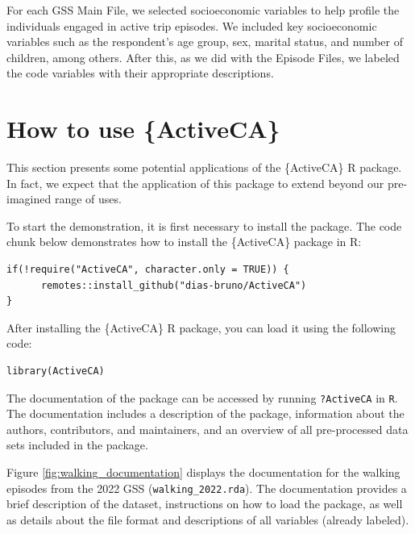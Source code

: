 \documentclass[Royal,times,sageh]{sagej}
\begin{document}
For each GSS Main File, we selected socioeconomic variables to help
profile the individuals engaged in active trip episodes. We included key
socioeconomic variables such as the respondent's age group, sex, marital
status, and number of children, among others. After this, as we did with
the Episode Files, we labeled the code variables with their appropriate
descriptions.

\section{How to use \{ActiveCA\}}\label{how-to-use-activeca}

This section presents some potential applications of the \{ActiveCA\} R
package. In fact, we expect that the application of this package to
extend beyond our pre-imagined range of uses.

To start the demonstration, it is first necessary to install the
package. The code chunk below demonstrates how to install the
\{ActiveCA\} package in R:

\begin{verbatim}
if(!require("ActiveCA", character.only = TRUE)) {
      remotes::install_github("dias-bruno/ActiveCA")
}
\end{verbatim}

After installing the \{ActiveCA\} R package, you can load it using the
following code:

\begin{verbatim}
library(ActiveCA)
\end{verbatim}

The documentation of the package can be accessed by running
\texttt{?ActiveCA} in \texttt{R}. The documentation includes a
description of the package, information about the authors, contributors,
and maintainers, and an overview of all pre-processed data sets included
in the package.

Figure \ref{fig:walking_documentation} displays the documentation for
the walking episodes from the 2022 GSS (\texttt{walking\_2022.rda}). The
documentation provides a brief description of the dataset, instructions
on how to load the package, as well as details about the file format and
descriptions of all variables (already labeled).
\end{document}
